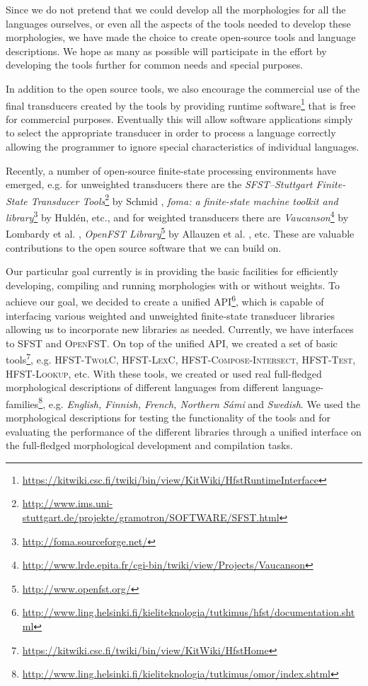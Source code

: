 \documentclass[a4paper]{article}
\begin{document}
Since we do not pretend that we could develop all the morphologies for
all the languages ourselves, or even all the aspects of the tools
needed to develop these morphologies, we have made the choice to
create open-source tools and language descriptions. We hope as many as
possible will participate in the effort by developing the tools
further for common needs and special purposes.

In addition to the open source tools, we also encourage the commercial
use of the final transducers created by the tools by providing runtime
software\footnote{\url{https://kitwiki.csc.fi/twiki/bin/view/KitWiki/HfstRuntimeInterface}}
that is free for commercial purposes. Eventually this will allow
software applications simply to select the appropriate transducer in
order to process a language correctly allowing the programmer to
ignore special characteristics of individual languages.

Recently, a number of open-source finite-state processing environments
have emerged, e.g.  for unweighted transducers there are the
\emph{SFST--Stuttgart Finite-State Transducer
Tools}\footnote{\url{http://www.ims.uni-stuttgart.de/projekte/gramotron/SOFTWARE/SFST.html}}
by Schmid \cite{sfst}, \emph{foma: a finite-state machine toolkit and
library}\footnote{\url{http://foma.sourceforge.net/}} by Huld\'en,
etc., and for weighted transducers there are
\emph{Vaucanson}\footnote{\url{http://www.lrde.epita.fr/cgi-bin/twiki/view/Projects/Vaucanson}}
by Lombardy et al. \cite{vaucanson}, \emph{OpenFST
Library}\footnote{\url{http://www.openfst.org/}} by Allauzen et
al. \cite{openfst}, etc. These are valuable contributions to the open
source software that we can build on.

Our particular goal currently is in providing the basic facilities for
efficiently developing, compiling and running morphologies with or
without weights. To achieve our goal, we decided to create a unified
API\footnote{\url{http://www.ling.helsinki.fi/kieliteknologia/tutkimus/hfst/documentation.shtml}},
which is capable of interfacing various weighted and unweighted
finite-state transducer libraries allowing us to incorporate new
libraries as needed.  Currently, we have interfaces to \textsc{SFST}
and \textsc{OpenFST}. On top of the unified API, we created a set of
basic
tools\footnote{\url{https://kitwiki.csc.fi/twiki/bin/view/KitWiki/HfstHome}},
e.g. \textsc{HFST-TwolC, HFST-LexC, HFST-Compose-Inter\-sect,
HFST-Test, HFST-Lookup}, etc. With these tools, we created or used
real full-fledged morphological descriptions of different languages
from different
language-families\footnote{\url{http://www.ling.helsinki.fi/kieliteknologia/tutkimus/omor/index.shtml}},
e.g.  \emph{English, Finnish, French, Northern S\'ami} and
\emph{Swedish}. We used the morphological descriptions for testing the
functionality of the tools and for evaluating the performance of the
different libraries through a unified interface on the full-fledged
morphological development and compilation tasks.
\end{document}
